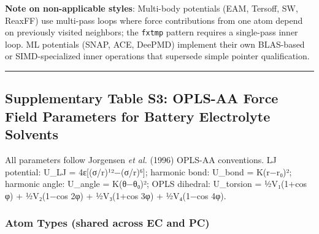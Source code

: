 \documentclass[
  11pt,
]{article}
\begin{document}
\textbf{Note on non-applicable styles}: Multi-body potentials (EAM,
Tersoff, SW, ReaxFF) use multi-pass loops where force contributions from
one atom depend on previously visited neighbors; the \texttt{fxtmp}
pattern requires a single-pass inner loop. ML potentials (SNAP, ACE,
DeePMD) implement their own BLAS-based or SIMD-specialized inner
operations that supersede simple pointer qualification.

\begin{center}\rule{0.5\linewidth}{0.5pt}\end{center}

\subsection{Supplementary Table S3: OPLS-AA Force Field Parameters for
Battery Electrolyte
Solvents}\label{supplementary-table-s3-opls-aa-force-field-parameters-for-battery-electrolyte-solvents}

All parameters follow Jorgensen \emph{et al.} (1996) OPLS-AA
conventions. LJ potential: U\_LJ = 4ε{[}(σ/r)¹²−(σ/r)⁶{]}; harmonic
bond: U\_bond = K(r−r₀)²; harmonic angle: U\_angle = K(θ−θ₀)²; OPLS
dihedral: U\_torsion = ½V₁(1+cos φ) + ½V₂(1−cos 2φ) + ½V₃(1+cos 3φ) +
½V₄(1−cos 4φ).

\subsubsection{Atom Types (shared across EC and
PC)}\label{atom-types-shared-across-ec-and-pc}
\end{document}
